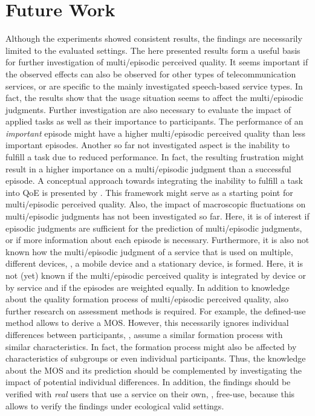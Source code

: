 \section{Future Work}
Although the experiments showed consistent results, the findings are necessarily limited to the evaluated settings.
The here presented results form a useful basis for further investigation of multi\-/episodic perceived quality.
It seems important if the observed effects can also be observed for other types of telecommunication services, or are specific to the mainly investigated speech-based service types.
In fact, the results show that the usage situation seems to affect the multi\-/episodic judgments.
Further investigation are also necessary to evaluate the impact of applied tasks as well as their importance to participants.
The performance of an \emph{important} episode might have a higher multi\-/episodic perceived quality than less important episodes.
Another so far not investigated aspect is the inability to fulfill a task due to reduced performance.
In fact, the resulting frustration might result in a higher importance on a multi\-/episodic judgment than a successful episode.
A conceptual approach towards integrating the inability to fulfill a task into \ac{QoE} is presented by \citet{leon-garcia_generalizing_2014}.
This framework might serve as a starting point for multi\-/episodic perceived quality.
Also, the impact of macroscopic fluctuations on multi\-/episodic judgments has not been investigated so far.
Here, it is of interest if episodic judgments are sufficient for the prediction of multi\-/episodic judgments, or if more information about each episode is necessary.
Furthermore, it is also not known how the multi\-/episodic judgment of a service that is used on multiple, different devices, \eg, a mobile device and a stationary device, is formed.
Here, it is not (yet) known if the multi\-/episodic perceived quality is integrated by device or by service and if the episodes are weighted equally.
In addition to knowledge about the quality formation process of multi\-/episodic perceived quality, also further research on assessment methods is required.
For example, the defined-use method allows to derive a \ac{MOS}.
However, this necessarily ignores individual differences between participants, \ie, assume a similar formation process with similar characteristics.
In fact, the formation process might also be affected by characteristics of subgroups or even individual participants.
Thus, the knowledge about the \ac{MOS} and its prediction should be complemented by investigating the impact of potential individual differences.
In addition, the findings should be verified with \emph{real} users that use a service on their own, \ie, free-use, because this allows to verify the findings under ecological valid settings.